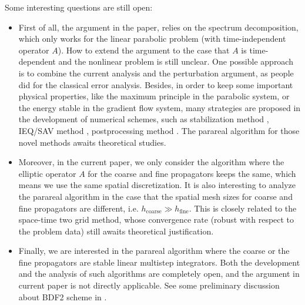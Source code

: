 Some interesting questions are still open:
\begin{itemize}
    \item First of all, the argument in the paper, relies on the spectrum decomposition, which only works for the linear parabolic problem (with time-independent operator $A$). How to extend the argument to the case that $A$ is time-dependent and the nonlinear problem is still unclear. One possible approach is to combine the current analysis and the perturbation argument, as people did for the classical error analysis. Besides, in order to keep some important physical properties, like the maximum principle in the parabolic system, or the energy stable in the gradient flow system, many strategies are proposed in the development of numerical schemes, such as stabilization method \cite{ShenTangYang:2016, DuJuLiQiao:SIAMREV}, IEQ/SAV method \cite{ShenXuYang:SIAMRev, Yang:IEQ}, postprocessing method \cite{LiYangZhou:cut, Xia:post}. The parareal algorithm for those novel methods awaits theoretical studies.
    \item Moreover, in the current paper, we only consider the algorithm where the elliptic operator $A$ for the coarse and fine propagators keeps the same, which means we use the same spatial discretization. It is also interesting to analyze the parareal algorithm in the case that the spatial mesh sizes for coarse and fine propagators are different, i.e. $h_{\text{coarse}} \gg h_{\text{fine}}$. This is closely related to the space-time two grid method, whose convergence rate (robust with respect to the problem data) still awaits theoretical justification.
    \item Finally, we are interested in the parareal algorithm where the coarse or the fine propagators are stable linear multistep integrators. Both the development and the analysis of such algorithms are completely open, and the argument in current paper is not directly applicable. See some preliminary discussion about BDF2 scheme in \cite{Maday:BDF2}.
\end{itemize}
